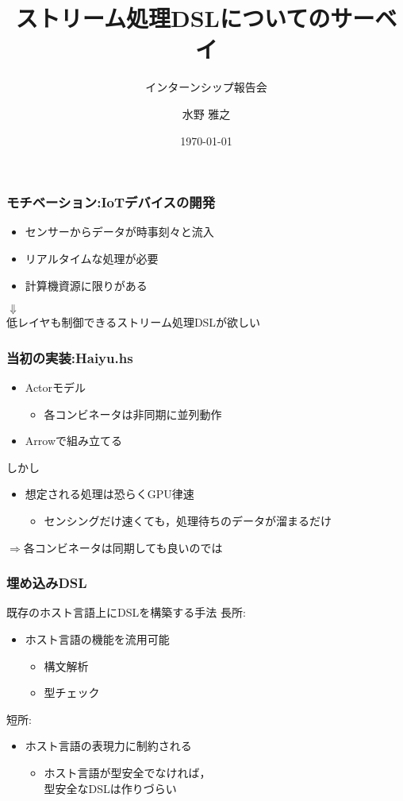 \documentclass[dvipdfmx,cjk,xcolor=dvipsnames,envcountsect,notheorems,12pt]{beamer}
\title{ストリーム処理DSLについてのサーベイ}
\subtitle{インターンシップ報告会}
\author{水野 雅之}
\date{\today}
\theoremstyle{definition}
\begin{document}
\frame[plain]{\titlepage}%

\begin{frame}
	\frametitle{モチベーション:IoTデバイスの開発}
	\begin{itemize}
		\item センサーからデータが時事刻々と流入
		\item リアルタイムな処理が必要
		\item 計算機資源に限りがある
	\end{itemize}
	\begin{center}
		\Large $\Downarrow$ \\
		\medskip
		低レイヤも制御できるストリーム処理DSLが欲しい
	\end{center}
\end{frame}

\begin{frame}
	\frametitle{当初の実装:Haiyu.hs}
	\begin{itemize}
		\item Actorモデル
			\begin{itemize}
				\item 各コンビネータは非同期に並列動作
			\end{itemize}
		\item Arrowで組み立てる
	\end{itemize}
	\vfill
	\Large
	しかし
	\begin{itemize}
		\item 想定される処理は恐らくGPU律速
			\begin{itemize}
				\item センシングだけ速くても，処理待ちのデータが溜まるだけ
			\end{itemize}
	\end{itemize}
	$\Rightarrow$各コンビネータは同期しても良いのでは
\end{frame}

\begin{frame}
	\frametitle{埋め込みDSL}
	\Large 既存のホスト言語上にDSLを構築する手法
	\vfill
	長所:
	\begin{itemize}
		\item ホスト言語の機能を流用可能
			\begin{itemize}
				\item 構文解析
				\item 型チェック
			\end{itemize}
	\end{itemize}
	\vfill
	短所:
	\begin{itemize}
		\item ホスト言語の表現力に制約される
			\begin{itemize}
				\item ホスト言語が型安全でなければ，\\型安全なDSLは作りづらい
			\end{itemize}
	\end{itemize}
\end{frame}
\end{document}
